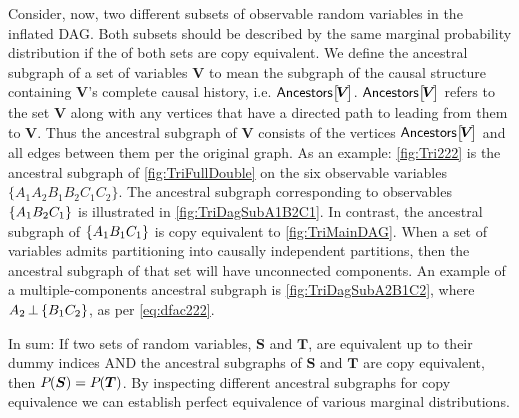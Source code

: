 \begin{asparadesc}
Consider, now, two different subsets of observable random variables in the inflated DAG. Both subsets should be described by the same marginal probability distribution if the  of both sets are copy equivalent. We define the ancestral subgraph of a set of variables $\bm{V}$ to mean the subgraph of the causal structure containing $\bm{V}$'s complete causal history, i.e. $\NamedFunction{Ancestors}{\!\bm{V}\!}$. $\NamedFunction{Ancestors}{\!\bm{V}\!}$ refers to the set $\bm{V}$ along with any vertices that have a directed path to leading from them to $\bm{V}$. Thus the ancestral subgraph of $\bm{V}$ consists of the vertices $\NamedFunction{Ancestors}{\!\bm{V}\!}$ and all edges between them per the original graph. As an example: \cref{fig:Tri222} is the ancestral subgraph of \cref{fig:TriFullDouble} on the six observable variables $\{A_1 A_2 B_1 B_2 C_1 C_2\}$. The ancestral subgraph corresponding to observables $\left\lbrace A_1 B_2 C_1\right\rbrace$ is illustrated in \cref{fig:TriDagSubA1B2C1}. In contrast, the ancestral subgraph of $\left\lbrace A_1 B_1 C_1\right\rbrace$ is copy equivalent to \cref{fig:TriMainDAG}. When a set of variables admits partitioning into causally independent partitions, then the ancestral subgraph of that set will have unconnected components. An example of a multiple-components ancestral subgraph is \cref{fig:TriDagSubA2B1C2}, where ${A_2\,\bot\,\brackets{B_1 C_2}}$, as per \cref{eq:dfac222}.


In sum: If two sets of random variables, $\bm{S}$ and $\bm{T}$, are equivalent up to their dummy indices AND the ancestral subgraphs of $\bm{S}$ and $\bm{T}$ are copy equivalent, then ${P_{}}\lparen\bm{S}\rparen={P_{}}\lparen\bm{T}\rparen$. By inspecting different ancestral subgraphs for copy equivalence we can establish perfect equivalence of various marginal distributions.


\end{asparadesc}


